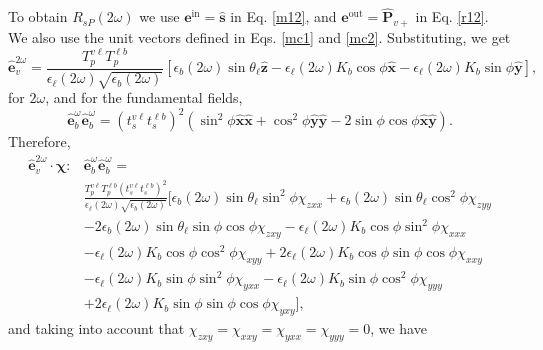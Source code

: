 \documentclass[10pt]{article}
\begin{document}
To obtain $R_{sP}(2\omega)$ we use $\mathbf{e}^{\mathrm{in}}=\hat{\mathbf{s}}$
in Eq. \eqref{m12}, and $\mathbf{e}^{\mathrm{out}}=\hat{\mathbf{P}}_{v+}$ in
Eq. \eqref{r12}. We also use the unit vectors defined in Eqs. \eqref{mc1} and
\eqref{mc2}. Substituting, we get
\begin{equation*}
\hat{\mathbf{e}}^{2\omega}_{v} 
= \frac{T^{v\ell}_{p}T^{\ell b}_{p}}
       {\epsilon_{\ell}(2\omega)\sqrt{\epsilon_{b}(2\omega)}}
\left[
  \epsilon_{b}(2\omega)\sin\theta_{\ell}\hat{\mathbf{z}} 
- \epsilon_{\ell}(2\omega)K_{b}\cos\phi\hat{\mathbf{x}} 
- \epsilon_{\ell}(2\omega)K_{b}\sin\phi\hat{\mathbf{y}}
\right],
\end{equation*}
for $2\omega$, and for the fundamental fields,
\begin{equation*}
\hat{\mathbf{e}}^{\omega}_{b}\hat{\mathbf{e}}^{\omega}_{b}
= \left(t^{v\ell}_{s}t^{\ell b}_{s}\right)^{2}
\left(
  \sin^{2}\phi\hat{\mathbf{x}}\hat{\mathbf{x}}
+ \cos^{2}\phi\hat{\mathbf{y}}\hat{\mathbf{y}} 
- 2\sin\phi\cos\phi\hat{\mathbf{x}}\hat{\mathbf{y}}
\right).
\end{equation*}
Therefore,
\begin{equation*}
\begin{split}
\hat{\mathbf{e}}^{2\omega}_{v}
\cdot\boldsymbol{\chi}:&
\hat{\mathbf{e}}^{\omega}_{b}\hat{\mathbf{e}}^{\omega}_{b} =\\
&\frac{T^{v\ell}_{p}T^{\ell b}_{p}\left(t^{v\ell}_{s}t^{\ell b}_{s}\right)^{2}}
      {\epsilon_{\ell}(2\omega)\sqrt{\epsilon_{b}(2\omega)}}
\big[
   \epsilon_{b}(2\omega)\sin\theta_{\ell}\sin^{2}\phi\chi_{zxx} 
 + \epsilon_{b}(2\omega)\sin\theta_{\ell}\cos^{2}\phi\chi_{zyy}\\
&- 2\epsilon_{b}(2\omega)\sin\theta_{\ell}\sin\phi\cos\phi\chi_{zxy}
 - \epsilon_{\ell}(2\omega)K_{b}\cos\phi\sin^{2}\phi\chi_{xxx}\\
&- \epsilon_{\ell}(2\omega)K_{b}\cos\phi\cos^{2}\phi\chi_{xyy}
 + 2\epsilon_{\ell}(2\omega)K_{b}\cos\phi\sin\phi\cos\phi\chi_{xxy}\\
&- \epsilon_{\ell}(2\omega)K_{b}\sin\phi\sin^{2}\phi\chi_{yxx}
 - \epsilon_{\ell}(2\omega)K_{b}\sin\phi\cos^{2}\phi\chi_{yyy}\\
&+ 2\epsilon_{\ell}(2\omega)K_{b}\sin\phi\sin\phi\cos\phi\chi_{yxy}
\big],
\end{split}
\end{equation*}
and taking into account that $\chi_{zxy} = \chi_{xxy} = \chi_{yxx} = \chi_{yyy}
= 0$, we have
\end{document}

